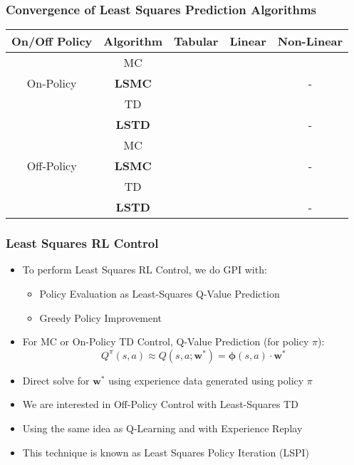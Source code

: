 \documentclass[handout]{beamer}
\newcommand{\cmark}{\ding{51}}%
\newcommand{\xmark}{\ding{55}}%
\begin{document}
\begin{frame}
\frametitle{Convergence of Least Squares Prediction Algorithms}
\pause
\begin{center}
      \begin{tabular}{ccccc}
      \hline
      On/Off Policy & Algorithm & Tabular & Linear & Non-Linear \\ \hline
      \multirow{3}{*}{On-Policy} & MC & \cmark & \cmark & \cmark \\
      & {\bf LSMC} & \cmark & \cmark & - \\
      & TD & \cmark & \cmark & \xmark \\ 
      & {\bf LSTD} & \cmark & \cmark & - \\ \hline
      \multirow{3}{*}{Off-Policy} & MC & \cmark & \cmark & \cmark \\
      & {\bf LSMC} & \cmark & \xmark & - \\
      & TD & \cmark & \xmark & \xmark \\
      & {\bf LSTD} & \cmark & \xmark & - \\ \hline
      \end{tabular}
\end{center}      
\end{frame}

\begin{frame}
\frametitle{Least Squares RL Control}
\pause
\begin{itemize}[<+->]
\item To perform Least Squares RL Control, we do GPI with:
\begin{itemize}[<+->]
\item Policy Evaluation as Least-Squares Q-Value Prediction
\item Greedy Policy Improvement
\end{itemize}
\item For MC or On-Policy TD Control, Q-Value Prediction (for policy $\pi$):
$$Q^{\pi}(s,a) \approx Q(s,a;\bm{w}^*) = \bm{\phi}(s,a) \cdot \bm{w}^*$$
\item Direct solve for $\bm{w}^*$ using experience data generated using policy $\pi$
\item We are interested in Off-Policy Control with Least-Squares TD
\item Using the same idea as Q-Learning and with Experience Replay
\item This technique is known as Least Squares Policy Iteration (LSPI)
\end{itemize}
\end{frame}
\end{document}
